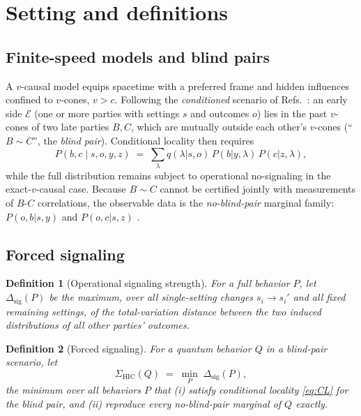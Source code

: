 \documentclass[10pt,twocolumn]{article}
\newtheorem{definition}{Definition}
\newcommand{\Sig}{\Sigma_{\mathrm{HIC}}}
\newcommand{\Dsig}{\Delta_{\mathrm{sig}}}
\begin{document}
\section{Setting and definitions}
\label{sec:setting}

\subsection{Finite-speed models and blind pairs}

A $v$-causal model \cite{Bancal2012,Barnea2013} equips spacetime with a preferred frame and hidden influences confined to $v$-cones, $v>c$. Following the \emph{conditioned} scenario of Refs.~\cite{Barnea2013,Li2026}: an early side $\mathcal E$ (one or more parties with settings $s$ and outcomes $o$) lies in the past $v$-cones of two late parties $B, C$, which are mutually outside each other's $v$-cones (``$B\sim C$'', the \emph{blind pair}). Conditional locality then requires
\begin{equation}
P(b,c \mid s,o,y,z) \;=\; \sum_\lambda q(\lambda|s,o)\, P(b|y,\lambda)\, P(c|z,\lambda),
\label{eq:CL}
\end{equation}
while the full distribution remains subject to operational no-signaling in the exact-$v$-causal case. Because $B\sim C$ cannot be certified jointly with measurements of $B$-$C$ correlations, the observable data is the \emph{no-blind-pair} marginal family: $P(o,b|s,y)$ and $P(o,c|s,z)$ \cite{Li2026}.

\subsection{Forced signaling}

\begin{definition}[Operational signaling strength]
For a full behavior $P$, let $\Dsig(P)$ be the maximum, over all single-setting changes $s_i \to s_i'$ and all fixed remaining settings, of the total-variation distance between the two induced distributions of \emph{all other parties' outcomes}.
\end{definition}

\begin{definition}[Forced signaling]
\label{def:sigma}
For a quantum behavior $Q$ in a blind-pair scenario, let
\begin{equation}
\Sig(Q) \;=\; \min_{P}\; \Dsig(P),
\end{equation}
the minimum over all behaviors $P$ that (i) satisfy conditional locality \eqref{eq:CL} for the blind pair, and (ii) reproduce every no-blind-pair marginal of $Q$ exactly.
\end{definition}
\end{document}
